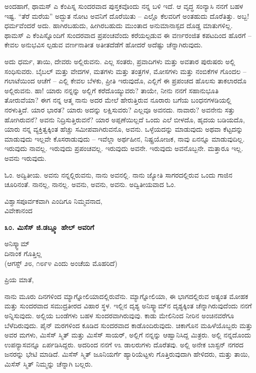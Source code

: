 ಅಂದಹಾಗೆ, ಥಾಮಸ್ ಎ ಕೆಂಪಿಸ್ನ ಸುಂದರವಾದ ಪುಸ್ತಕವೊಂದು ನನ್ನ ಬಳಿ ಇದೆ. ಆ ವೃದ್ಧ ಸಂನ್ಯಾಸಿ ನನಗೆ ಬಹಳ ಇಷ್ಟ. “ತೆರೆ ಮರೆಯ” ಅದ್ಭುತ ನೋಟ ಅವನಿಗೆ ದೊರೆಯಿತು – ಎಲ್ಲೊ ಕೆಲವರಿಗೆ ಅಂತಹುದು ದೊರೆತಿತ್ತು. ಅಬ್ಬ! ಧರ್ಮವೆಂದರೆ ಅದು. ಹಾಗಿರಬಹುದು, ಹೀಗಿರಬಹುದು ಮುಂತಾದ ಅನುಮಾನಾಸ್ಪದ ದೊಡ್ಡ ಮಾತುಗಳಿಲ್ಲ. ಥಾಮಸ್ ಎ ಕೆಂಪಿಸ್ನೊಂದಿಗೆ ಸುಂದರವಾದ ಪ್ರಪಂಚವೆಂದು ಕರೆಯಲ್ಪಡುವ ಈ ವರ್ಣರಂಜಿತ ಕಪಟದಿಂದ ಹೊರಗೆ – ಕೇವಲ ಅನುಭವಿಸ ಲ್ಪಡುವ ವರ್ಣನಾತೀತ ಅತೀತದೆಡೆಗೆ ಹೋದರೆ ಅದೆಷ್ಟು ಚೆನ್ನಾಗಿರುವುದು.

ಅದು ಧರ್ಮ, ತಾಯಿ, ದೇವರು ಅಲ್ಲಿರುವನು. ಎಲ್ಲ ಸಂತರು, ಪ್ರವಾದಿಗಳು ಮತ್ತು ಅವತಾರ ಪುರುಷರು ಅಲ್ಲಿ ಸಂಧಿಸುವರು. ಬೈಬಲ್ ಮತ್ತು ವೇದಗಳ, ಮತಗಳು ಮತ್ತು ತಂತ್ರಗಳ, ಮೋಸಗಳು ಮತ್ತು ನಂಬಿಕೆಗಳ ಗೊಂದಲ – ಗಲಾಟೆಯಿಂದ ಆಚೆಗೆ – ಎಲ್ಲಿ ಕೇವಲ ಬೆಳಕು, ಪ್ರೀತಿ ಇರುವುದೊ, ಎಲ್ಲಿಗೆ ಈ ಪ್ರಪಂಚದ ಹೊಲಸು ತಾಕಲಾರದೊ ಅಲ್ಲಿರುವನು. ಹಾ! ಯಾರು ನನ್ನನ್ನು ಅಲ್ಲಿಗೆ ಕರೆದೊಯ್ಯುವರು? ತಾಯೇ, ನೀನು ನನಗೆ ಸಹಾನುಭೂತಿ ತೋರುವೆಯಾ? ಈಗ ನನ್ನ ಆತ್ಮ ನಾನು ಅದರ ಮೇಲೆ ಹೇರುತ್ತಿರುವ ನೂರಾರು ಬಗೆಯ ಬಂಧನಗಳಡಿಯಲ್ಲಿ ನರಳುತ್ತಿದೆ. ಯಾರ ಭಾರತ? ಯಾರು ಅದನ್ನು ಲಕ್ಷಿಸುವರು? ಎಲ್ಲವೂ ಅವನದು. ನಾವಾರು? ಅವನೇನು ಸತ್ತು ಹೋಗಿರುವನೆ? ಅವನು ನಿದ್ರಿಸುತ್ತಿರುವನೆ? ಯಾರ ಅಪ್ಪಣೆಯಿಲ್ಲದೆ ಒಂದು ಎಲೆ ಬೀಳದೊ, ಹೃದಯ ಬಡಿಯದೊ, ಯಾರು ನನ್ನ ವ್ಯಕ್ತಿತ್ವಕ್ಕಿಂತ ಹೆಚ್ಚು ಸಮೀಪವಾಗಿರುವನೊ, ಅವನು. ಒಳ್ಳೆಯದನ್ನು ಮಾಡುವುದು ಅಥವಾ ಕೆಟ್ಟದನ್ನು ಮಾಡುವುದು ಇಲ್ಲವೇ ಕೊಸರಾಡುವುದು – ಇವೆಲ್ಲಾ ಅರ್ಥಹೀನ, ನಿಷ್ಪ್ರಯೋಜಕ, ನಾವು ಏನನ್ನೂ ಮಾಡುವುದಿಲ್ಲ. ಇರುವುದು ನಾವಲ್ಲ. ಇರುವುದು ಪ್ರಪಂಚವಲ್ಲ. ಇರುವುದು ಅವನೇ. ಇರುವುದು ಅವನೊಬ್ಬನೇ. ಮತ್ತಾರೂ ಇಲ್ಲ. ಅವನು ಇರುವುದು.

ಓಂ. ಅದ್ವಿತೀಯ. ಅವನು ನನ್ನಲ್ಲಿರುವನು, ನಾನು ಅವನಲ್ಲಿ. ನಾನು ಜ್ಯೋತಿ ಸಾಗರದಲ್ಲಿರುವ ಒಂದು ಗಾಜಿನ ಚೂರಿನಂತೆ. ನಾನಲ್ಲ, ನಾನಲ್ಲ. ಅವನು, ಅವನು, ಅವನು. ಅದ್ವಿತೀಯವಾದ ಓಂ.

\begin{flushright}
ವಿಶ್ವಾಸಪೂರ್ವಕವಾಗಿ ಎಂದಿಗೂ ನಿಮ್ಮವನಾದ,\\ವಿವೇಕಾನಂದ
\end{flushright}

\begin{center}
\textbf{೩೦. ಮಿಸೆಸ್ ಜಿ.ಡಬ್ಲ್ಯೂ ಹೇಲ್ ಅವರಿಗೆ}
\end{center}

\begin{flushright}
ಅನಿಸ್ಕ್ವಾಮ್​\\ದಿನಾಂಕ ಗೊತ್ತಿಲ್ಲ\\(ಆಗಸ್ಟ್ ೨೮, ೧೮೯೪ ಎಂದು ಅಂಚೆಯ ಮೊಹರಿದೆ)
\end{flushright}

ಪ್ರಿಯ ಮಾತೆ,

ನಾನು ಮೂರು ದಿನಗಳಿಂದ ಮ್ಯಾಗ್ನೋಲಿಯಾದಲ್ಲಿರುವೆನು. ಮ್ಯಾಗ್ನೋಲಿಯಾ, ಈ ಭಾಗದಲ್ಲಿರುವ ಅತ್ಯಂತ ಮೋಹಕ ಮತ್ತು ಸುಂದರವಾದ ಸಮುದ್ರತೀರದ ವಿಹಾರ ಸ್ಥಳ. ಇಲ್ಲಿನ ದೃಶ್ಯ ಅನಿಸ್ಕ್ವಾಮ್​ನ ದೃಶ್ಯಕ್ಕಿಂತ ಚೆನ್ನಾಗಿರುವುದೆಂದು ನನಗೆ ಅನ್ನಿಸುವುದು. ಅಲ್ಲಿಯ ಬಂಡೆಗಳು ಬಹಳ ಸುಂದರವಾಗಿರುವುವು. ಕಾಡು ಮೇಲಿನಿಂದ ನೀರಿನ ಅಂಚಿನವರೆಗೂ ಬೆಳೆದಿರುವುದು. ಪೈನ್ ಮರಗಳಿಂದ ಕೂಡಿದ ಸುಂದರವಾದ ಕಾಡೊಂದಿರುವುದು. ಚಿಕಾಗೊನ ಮಹಿಳೆಯೊಬ್ಬರು ಮತ್ತು ಅವರ ಮಗಳು, ಮಿಸೆಸ್ ಸ್ಮಿತ್ ಮತ್ತು ಮಿಸೆಸ್ ಸಾಯರ್, ಅಲ್ಲಿಗೆ ನನ್ನನ್ನು ಆಹ್ವಾನಿಸಿದ್ದ ಮಿತ್ರರು. ಅಲ್ಲಿ ನನ್ನದೊಂದು ಉಪನ್ಯಾಸವನ್ನೂ ಏರ್ಪಡಿಸಿದ್ದರು. ಅದರಿಂದ ನನಗೆ ೪೩ ಡಾಲರುಗಳು ದೊರೆತವು. ಅಲ್ಲಿ ಅನೇಕ ಬಾಸ್ಟನ್ ನಗರದ ಜನರನ್ನು ಭೇಟಿ ಮಾಡಿದೆ. ಮಿಸೆಸ್ ಸ್ಮಿತ್ ಜೂನಿಯರ್ಗೆ ಹ್ಯಾರಿಯೆಟ್ಟಳು ಗೊತ್ತಿರುವುದಾಗಿ ಹೇಳಿದರು, ಮತ್ತು ತಾಯಿ, ಮಿಸೆಸ್ ಸ್ಮಿತ್ ನಿಮ್ಮನ್ನು ಚೆನ್ನಾಗಿ ಬಲ್ಲರು.

